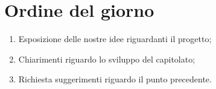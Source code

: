 \documentclass[../verbale-2016-12-17.tex]{subfiles}
\begin{document}
	
\section{Ordine del giorno}
	\begin{enumerate}
		\item Esposizione delle nostre idee riguardanti il progetto;
		\item Chiarimenti riguardo lo sviluppo del capitolato;
		\item Richiesta suggerimenti riguardo il punto precedente.
	\end{enumerate}	
\end{document}
